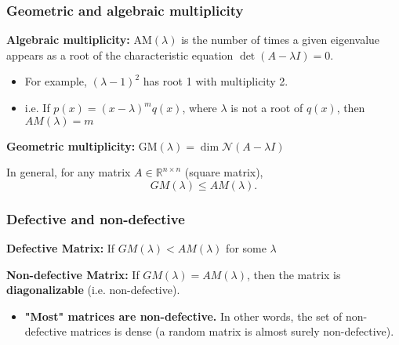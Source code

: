 \subsubsection{Geometric and algebraic multiplicity}
\begin{definition}

    \textbf{Algebraic multiplicity:} $\text{AM}(\lambda)$ is the number of times a given eigenvalue appears as a root of the characteristic equation $\det(A - \lambda I) = 0$.
    \begin{itemize}
        \item For example, $(\lambda - 1)^2$ has root 1 with multiplicity 2.
        \item i.e. If $p(x)=(x-\lambda)^m q(x)$, where $\lambda$ is not a root of $q(x)$, then $AM(\lambda)=m$
    \end{itemize}
    \vspace{1em}

    \textbf{Geometric multiplicity:} $\text{GM}(\lambda) = \dim \mathcal{N}(A - \lambda I)$
\end{definition}

\begin{theorem}
    In general, for any matrix $A \in \mathbb{R}^{n \times n}$ (square matrix),
    \[
    GM(\lambda) \leq AM(\lambda).
    \]
\end{theorem}

\subsubsection{Defective and non-defective}
\begin{definition}

    \textbf{Defective Matrix:} If $GM(\lambda) < AM(\lambda)$ for some $\lambda$
    \vspace{1em}

    \textbf{Non-defective Matrix:} If $GM(\lambda) = AM(\lambda)$, then the matrix is \textbf{diagonalizable} (i.e. non-defective).
    \begin{itemize}
        \item \textbf{"Most" matrices are non-defective.} In other words, the set of non-defective matrices is dense (a random matrix is almost surely non-defective).
    \end{itemize}

\end{definition}

